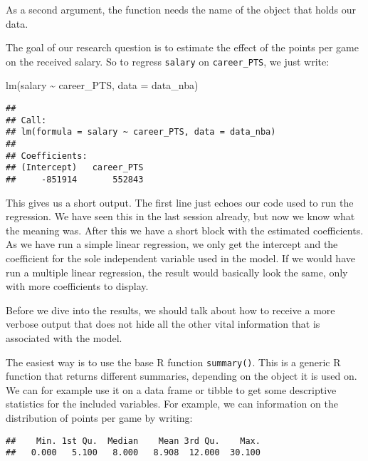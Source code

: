 \documentclass[
]{book}
\newenvironment{Shaded}{\begin{snugshade}}{\end{snugshade}}
\newcommand{\AttributeTok}[1]{\textcolor[rgb]{0.77,0.63,0.00}{#1}}
\newcommand{\FunctionTok}[1]{\textcolor[rgb]{0.00,0.00,0.00}{#1}}
\newcommand{\NormalTok}[1]{#1}
\newcommand{\SpecialCharTok}[1]{\textcolor[rgb]{0.00,0.00,0.00}{#1}}
\begin{document}
As a second argument, the function needs the name of the object that holds our
data.

The goal of our research question is to estimate the effect of the points per
game on the received salary. So to regress \texttt{salary} on \texttt{career\_PTS}, we just
write:

\begin{Shaded}
\begin{Highlighting}[]
\FunctionTok{lm}\NormalTok{(salary }\SpecialCharTok{\textasciitilde{}}\NormalTok{ career\_PTS, }\AttributeTok{data =}\NormalTok{ data\_nba)}
\end{Highlighting}
\end{Shaded}

\begin{verbatim}
## 
## Call:
## lm(formula = salary ~ career_PTS, data = data_nba)
## 
## Coefficients:
## (Intercept)   career_PTS  
##     -851914       552843
\end{verbatim}

This gives us a short output. The first line just echoes our code used to run
the regression. We have seen this in the last session already, but now we know
what the meaning was. After this we have a short block with the estimated
coefficients. As we have run a simple linear regression, we only get the
intercept and the coefficient for the sole independent variable used in the
model. If we would have run a multiple linear regression, the result would
basically look the same, only with more coefficients to display.

Before we dive into the results, we should talk about how to receive a more
verbose output that does not hide all the other vital information that is
associated with the model.

The easiest way is to use the base R function \texttt{summary()}. This is a generic R
function that returns different summaries, depending on the object it is used
on. We can for example use it on a data frame or tibble to get some descriptive
statistics for the included variables. For example, we can information on the
distribution of points per game by writing:

\begin{Shaded}
\end{Shaded}

\begin{verbatim}
##    Min. 1st Qu.  Median    Mean 3rd Qu.    Max. 
##   0.000   5.100   8.000   8.908  12.000  30.100
\end{verbatim}
\end{document}
